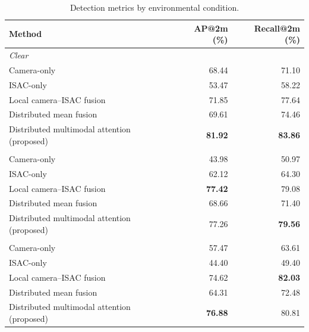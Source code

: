 \begin{table}[H]
    \centering
    \caption{Detection metrics by environmental condition.}
    \label{tab:experiments-weather-detection}
    \small
    \renewcommand{\arraystretch}{1.08}
    \begin{tabular}{lrr}
        \toprule
        Method & AP@2m (\%) & Recall@2m (\%) \\
        \midrule
        \multicolumn{3}{l}{\textit{Clear}} \\
        Camera-only & 68.44 & 71.10 \\
        ISAC-only & 53.47 & 58.22 \\
        Local camera--ISAC fusion & 71.85 & 77.64 \\
        Distributed mean fusion & 69.61 & 74.46 \\
        Distributed multimodal attention (proposed) & \textbf{81.92} & \textbf{83.86} \\
        \addlinespace
        \multicolumn{3}{l}{\textit{Rain/Fog}} \\
        Camera-only & 43.98 & 50.97 \\
        ISAC-only & 62.12 & 64.30 \\
        Local camera--ISAC fusion & \textbf{77.42} & 79.08 \\
        Distributed mean fusion & 68.66 & 71.40 \\
        Distributed multimodal attention (proposed) & 77.26 & \textbf{79.56} \\
        \addlinespace
        \multicolumn{3}{l}{\textit{Night}} \\
        Camera-only & 57.47 & 63.61 \\
        ISAC-only & 44.40 & 49.40 \\
        Local camera--ISAC fusion & 74.62 & \textbf{82.03} \\
        Distributed mean fusion & 64.31 & 72.48 \\
        Distributed multimodal attention (proposed) & \textbf{76.88} & 80.81 \\
        \bottomrule
    \end{tabular}
\end{table}

